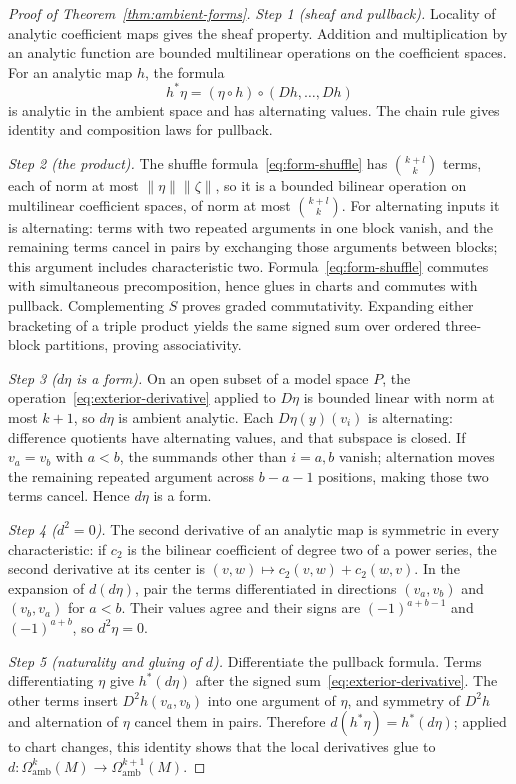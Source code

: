 \documentclass[11pt]{amsart}
\theoremstyle{definition}
\theoremstyle{remark}
\numberwithin{equation}{section}
\newcommand{\norm}[1]{\lVert #1\rVert}
\theoremstyle{plain}
\theoremstyle{definition}
\theoremstyle{plain}
\begin{document}
\begin{proof}[Proof of Theorem~\ref{thm:ambient-forms}]
\emph{Step 1 (sheaf and pullback).} Locality of analytic coefficient maps gives the sheaf property. Addition and multiplication by an analytic function are bounded multilinear operations on the coefficient spaces. For an analytic map $h$, the formula
\[
 h^*\eta=(\eta\circ h)\circ(Dh,\ldots,Dh)
\]
is analytic in the ambient space and has alternating values. The chain rule gives identity and composition laws for pullback.

\emph{Step 2 (the product).} The shuffle formula~\eqref{eq:form-shuffle} has $\binom{k+l}{k}$ terms, each of norm at most $\norm\eta\norm\zeta$, so it is a bounded bilinear operation on multilinear coefficient spaces, of norm at most $\binom{k+l}{k}$. For alternating inputs it is alternating: terms with two repeated arguments in one block vanish, and the remaining terms cancel in pairs by exchanging those arguments between blocks; this argument includes characteristic two. Formula~\eqref{eq:form-shuffle} commutes with simultaneous precomposition, hence glues in charts and commutes with pullback. Complementing $S$ proves graded commutativity. Expanding either bracketing of a triple product yields the same signed sum over ordered three-block partitions, proving associativity.

\emph{Step 3 ($d\eta$ is a form).} On an open subset of a model space $P$, the operation~\eqref{eq:exterior-derivative} applied to $D\eta$ is bounded linear with norm at most $k+1$, so $d\eta$ is ambient analytic. Each $D\eta(y)(v_i)$ is alternating: difference quotients have alternating values, and that subspace is closed. If $v_a=v_b$ with $a<b$, the summands other than $i=a,b$ vanish; alternation moves the remaining repeated argument across $b-a-1$ positions, making those two terms cancel. Hence $d\eta$ is a form.

\emph{Step 4 ($d^2=0$).} The second derivative of an analytic map is symmetric in every characteristic: if $c_2$ is the bilinear coefficient of degree two of a power series, the second derivative at its center is $(v,w)\mapsto c_2(v,w)+c_2(w,v)$. In the expansion of $d(d\eta)$, pair the terms differentiated in directions $(v_a,v_b)$ and $(v_b,v_a)$ for $a<b$. Their values agree and their signs are $(-1)^{a+b-1}$ and $(-1)^{a+b}$, so $d^2\eta=0$.

\emph{Step 5 (naturality and gluing of $d$).} Differentiate the pullback formula. Terms differentiating $\eta$ give $h^*(d\eta)$ after the signed sum~\eqref{eq:exterior-derivative}. The other terms insert $D^2h(v_a,v_b)$ into one argument of $\eta$, and symmetry of $D^2h$ and alternation of $\eta$ cancel them in pairs. Therefore $d(h^*\eta)=h^*(d\eta)$; applied to chart changes, this identity shows that the local derivatives glue to $d\colon\Omega^k_{\mathrm{amb}}(M)\to\Omega^{k+1}_{\mathrm{amb}}(M)$.


\end{proof}
\end{document}
